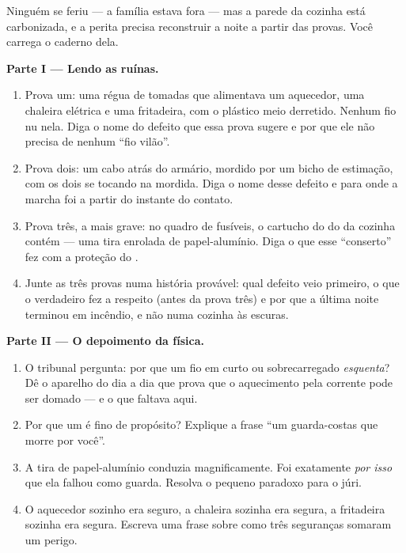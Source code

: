 \begin{problem}\label{pb:g7:short-circuits-safety:1}
Ninguém se feriu --- a família estava fora --- mas a parede da
cozinha está carbonizada, e a perita precisa reconstruir a noite a
partir das provas. Você carrega o caderno dela.

\medskip\noindent\textbf{Parte I --- Lendo as ruínas.}
\begin{enumerate}
  \item Prova um: uma régua de tomadas que alimentava um aquecedor,
        uma chaleira elétrica e uma fritadeira, com o plástico
        meio derretido. Nenhum fio nu nela. Diga o nome do defeito
        que essa prova sugere e por que ele não precisa de nenhum
        ``fio vilão''.
  \item Prova dois: um cabo atrás do armário, mordido por um bicho de
        estimação, com os dois  se tocando na mordida. Diga
        o nome desse defeito e para onde a marcha foi a partir do
        instante do contato.
  \item Prova três, a mais grave: no quadro de fusíveis, o cartucho
        do  do  da cozinha contém --- uma tira enrolada de
        papel-alumínio. Diga o que esse ``conserto'' fez com a
        proteção do .
  \item Junte as três provas numa história provável: qual defeito veio
        primeiro, o que o  verdadeiro fez a respeito (antes da
        prova três) e por que a última noite terminou em incêndio, e
        não numa cozinha às escuras.
\end{enumerate}

\medskip\noindent\textbf{Parte II --- O depoimento da física.}
\begin{enumerate}[resume]
  \item O tribunal pergunta: por que um fio em curto ou sobrecarregado
        \emph{esquenta}? Dê o aparelho do dia a dia que prova que o
        aquecimento pela corrente pode ser domado --- e o que faltava
        aqui.
  \item Por que um  é fino de propósito? Explique a frase ``um
        guarda-costas que morre por você''.
  \item A tira de papel-alumínio conduzia magnificamente. Foi
        exatamente \emph{por isso} que ela falhou como guarda.
        Resolva o pequeno paradoxo para o júri.
  \item O aquecedor sozinho era seguro, a chaleira sozinha era segura,
        a fritadeira sozinha era segura. Escreva uma frase sobre como
        três seguranças somaram um perigo.
\end{enumerate}


\end{problem}
